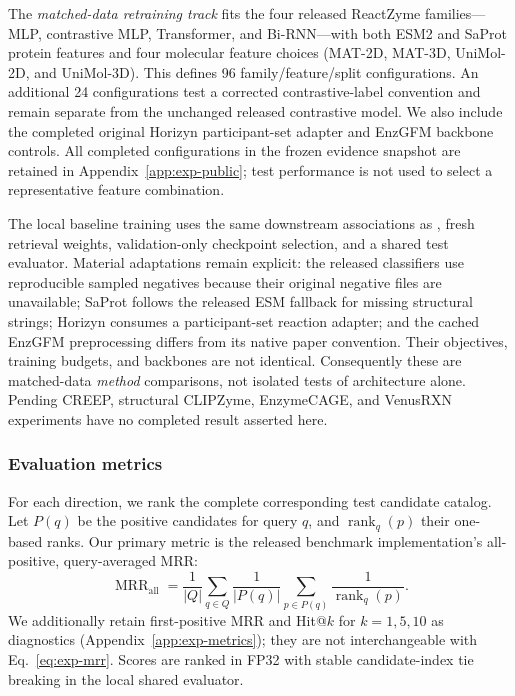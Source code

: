 The \emph{matched-data retraining track} fits the four released ReactZyme
families---MLP, contrastive MLP, Transformer, and Bi-RNN---with both ESM2 and
SaProt protein features and four molecular feature choices (MAT-2D, MAT-3D,
UniMol-2D, and UniMol-3D). This defines 96 family/feature/split configurations.
An additional 24 configurations test a corrected contrastive-label convention
and remain separate from the unchanged released contrastive model. We also
include the completed original Horizyn participant-set adapter
\citep{rocks2026horizyn} and EnzGFM backbone controls. All completed
configurations in the frozen evidence snapshot are retained in
Appendix~\ref{app:exp-public}; test performance is not used to select a
representative feature combination.

The local baseline training uses the same downstream associations as
\methodname, fresh retrieval weights, validation-only checkpoint selection,
and a shared test evaluator. Material adaptations remain explicit: the
released classifiers use reproducible sampled negatives because their
original negative files are unavailable; SaProt follows the released ESM
fallback for missing structural strings; Horizyn consumes a participant-set
reaction adapter; and the cached EnzGFM preprocessing differs from its native
paper convention. Their objectives, training budgets, and backbones are not
identical. Consequently these are matched-data \emph{method} comparisons,
not isolated tests of architecture alone. Pending CREEP, structural CLIPZyme,
EnzymeCAGE, and VenusRXN experiments have no completed result asserted here.

\subsubsection{Evaluation metrics}

For each direction, we rank the complete corresponding test candidate catalog.
Let $P(q)$ be the positive candidates for query $q$, and
$\operatorname{rank}_{q}(p)$ their one-based ranks. Our primary metric is the
released benchmark implementation's all-positive, query-averaged MRR:
\begin{equation}
 \operatorname{MRR}_{\mathrm{all}}
 =\frac{1}{|Q|}\sum_{q\in Q}
   \frac{1}{|P(q)|}\sum_{p\in P(q)}
   \frac{1}{\operatorname{rank}_{q}(p)}.
 \label{eq:exp-mrr}
\end{equation}
We additionally retain first-positive MRR and Hit@$k$ for $k=1,5,10$ as
diagnostics (Appendix~\ref{app:exp-metrics}); they are not interchangeable
with Eq.~\eqref{eq:exp-mrr}. Scores are ranked in FP32 with stable
candidate-index tie breaking in the local shared evaluator.

